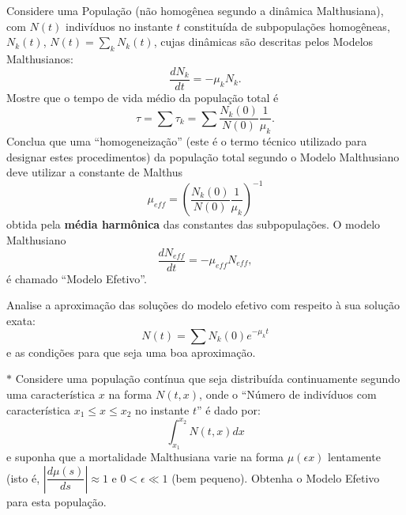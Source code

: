 \begin{exercise}
Considere uma População (não homogênea segundo a dinâmica Malthusiana), com \(N(t)\) indivíduos no instante \(t\) constituída de subpopulações homogêneas, \(N_k(t)\), \(N(t) = \sum_{k} N_k(t)\), cujas dinâmicas são descritas pelos Modelos Malthusianos:
\[\dfrac{dN_k}{dt} = -\mu_k N_k.\]
Mostre que o tempo de vida médio da população total é
\[\tau = \sum \tau_k = \sum \dfrac{N_k(0)}{N(0)}\dfrac{1}{\mu_k}.\]
Conclua que uma ``homogeneização'' (este é o termo técnico utilizado para designar estes procedimentos) da população total segundo o Modelo Malthusiano deve utilizar a constante de Malthus
\[\mu_{eff} = \left(\dfrac{N_k(0)}{N(0)}\dfrac{1}{\mu_k}\right)^{-1}\]
obtida pela \textbf{média harmônica} das constantes das subpopulações. O modelo Malthusiano
\[\dfrac{dN_{eff}}{dt} = -\mu_{eff} N_{eff},\]
é chamado ``Modelo Efetivo''.
\end{exercise}

\begin{exercise}
Analise a aproximação das soluções do modelo efetivo com respeito à sua solução exata:
\[N(t) = \sum N_k(0) e^{-\mu_k t}\]
e as condições para que seja uma boa aproximação. 
\end{exercise}

\begin{exercise}\(\ast\)
Considere uma população contínua que seja distribuída continuamente segundo uma característica \(x\) na forma \(N(t, x)\), onde o ``Número de indivíduos com característica \(x_1 \le x \le x_2\) no instante \(t\)'' é dado por:
\[\int_{x_1}^{x_2} N(t, x)  dx\]
e suponha que a mortalidade Malthusiana varie na forma \(\mu(\epsilon x)\) lentamente (isto é, \(\left|\dfrac{d\mu(s)}{ds}\right| \approx 1\) e \(0 < \epsilon \ll 1\) (bem pequeno). Obtenha o Modelo Efetivo para esta população.
\end{exercise}



